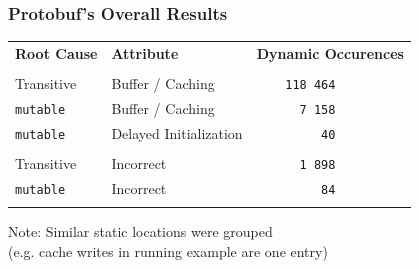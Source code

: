 \documentclass[aspectratio=43]{beamer}
\begin{document}
  \begin{frame}
    \frametitle{Protobuf's Overall Results}
    \large
    \begin{tabular}{b{2.6cm} b{4.2cm} b{2.7cm}}
      \textbf{Root Cause} & \textbf{Attribute}
      & \textbf{Dynamic \newline Occurences} \\
      & & \\
      Transitive       & Buffer / Caching       & \texttt{~~~~118 464} \\
      \texttt{mutable} & Buffer / Caching       & \texttt{~~~~~~7 158} \\
      \texttt{mutable} & Delayed Initialization & \texttt{~~~~~~~~~40} \\
      & & \\
      Transitive       & Incorrect              & \texttt{~~~~~~1 898} \\
      \texttt{mutable} & Incorrect              & \texttt{~~~~~~~~~84} \\
      & & \\
    \end{tabular}

    \vspace{2em}
    \normalsize
    Note: Similar static locations were grouped
    \\(e.g. cache writes in running example are one entry)
  \end{frame}
\end{document}
